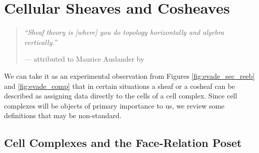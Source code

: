 
%
%


\chapter{Cellular Sheaves and Cosheaves}
\label{sec:cell_sheaves}

\begin{quote}
{\em``Sheaf theory is [where] you do topology horizontally and algebra vertically.''}
\begin{flushright} --- attributed to Maurice Auslander by~\cite{gray} \end{flushright}
\end{quote}

We can take it as an experimental observation from Figures \ref{fig:evade_sec_reeb} and \ref{fig:evade_comp} that in certain situations a sheaf or a cosheaf can be described as assigning data directly to the cells of a cell complex. Since cell complexes will be objects of primary importance to us, we review some definitions that may be non-standard.

\section{Cell Complexes and the Face-Relation Poset}

